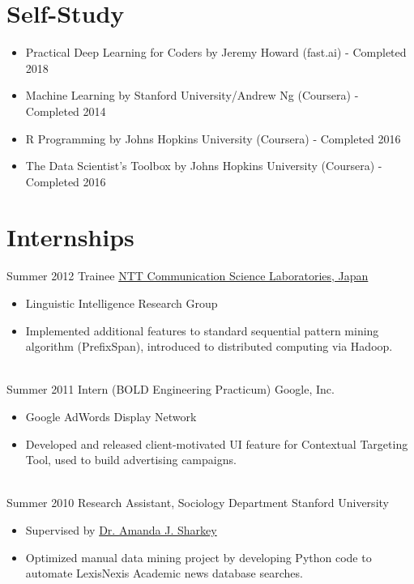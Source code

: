 \documentclass[letterpaper]{twentysecondcv} %
\begin{document}
\section{Self-Study}
\begin{itemize} \itemsep -2pt %
        \item Practical Deep Learning for Coders by Jeremy Howard (fast.ai) - Completed 2018
        \item Machine Learning by Stanford University/Andrew Ng (Coursera) - Completed 2014
       	\item R Programming by Johns Hopkins University (Coursera) - Completed 2016
        \item The Data Scientist's Toolbox by Johns Hopkins University (Coursera) - Completed 2016
\end{itemize}


\section{Internships}
\begin{twenty}
	\twentyitem
    	{Summer}
        {2012}
        {Trainee}
        {\href{http://www.kecl.ntt.co.jp/rps/index.html}{NTT Communication Science Laboratories, Japan}}
        {}
        {\begin{itemize} \itemsep -2pt %
        \item Linguistic Intelligence Research Group
       	\item Implemented additional features to standard sequential pattern mining algorithm (PrefixSpan), introduced to distributed computing via Hadoop.
        \end{itemize}}
    \\
    \twentyitem
    	{Summer}
        {2011}
        {Intern (BOLD Engineering Practicum)}
        {Google, Inc.}
        {}
        {\begin{itemize}  \itemsep -2pt %
        \item Google AdWords Display Network
        \item Developed and released client-motivated UI feature for Contextual Targeting Tool,
            used to build advertising campaigns.
        \end{itemize}}
    \\
    \twentyitem
    	{Summer}
        {2010}
        {Research Assistant, Sociology Department}
        {Stanford University}
        {}
        {\begin{itemize}  \itemsep -2pt %
        \item Supervised by \href{https://www.chicagobooth.edu/faculty/directory/s/amanda-j-sharkey}{Dr. Amanda J. Sharkey}
        \item Optimized manual data mining project by developing Python code to automate
            LexisNexis Academic news database searches.
        \end{itemize} }
\end{twenty}
\end{document}
